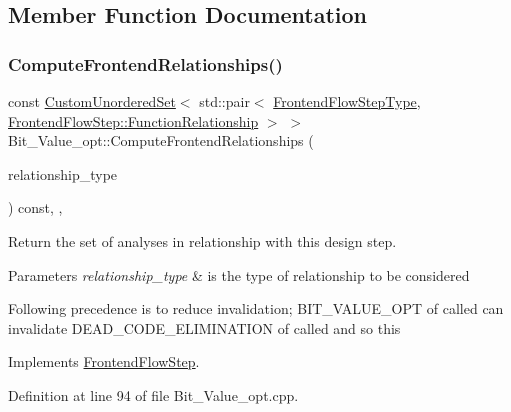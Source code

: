 \subsection{Member Function Documentation}
\mbox{\label{classBit__Value__opt_a8c842c1ab18449cecf5586caef4c7112}} 
\subsubsection{\texorpdfstring{Compute\+Frontend\+Relationships()}{ComputeFrontendRelationships()}}
{\footnotesize\ttfamily const \hyperlink{classCustomUnorderedSet}{Custom\+Unordered\+Set}$<$ std\+::pair$<$ \hyperlink{frontend__flow__step_8hpp_afeb3716c693d2b2e4ed3e6d04c3b63bb}{Frontend\+Flow\+Step\+Type}, \hyperlink{classFrontendFlowStep_af7cf30f2023e5b99e637dc2058289ab0}{Frontend\+Flow\+Step\+::\+Function\+Relationship} $>$ $>$ Bit\+\_\+\+Value\+\_\+opt\+::\+Compute\+Frontend\+Relationships (\begin{DoxyParamCaption}\item[{const \hyperlink{classDesignFlowStep_a723a3baf19ff2ceb77bc13e099d0b1b7}{Design\+Flow\+Step\+::\+Relationship\+Type}}]{relationship\+\_\+type }\end{DoxyParamCaption}) const\hspace{0.3cm}{\ttfamily [override]}, {\ttfamily [private]}, {\ttfamily [virtual]}}



Return the set of analyses in relationship with this design step. 


\begin{DoxyParams}{Parameters}
{\em relationship\+\_\+type} & is the type of relationship to be considered \\
\hline
\end{DoxyParams}
Following precedence is to reduce invalidation; B\+I\+T\+\_\+\+V\+A\+L\+U\+E\+\_\+\+O\+PT of called can invalidate D\+E\+A\+D\+\_\+\+C\+O\+D\+E\+\_\+\+E\+L\+I\+M\+I\+N\+A\+T\+I\+ON of called and so this 

Implements \hyperlink{classFrontendFlowStep_abeaff70b59734e462d347ed343dd700d}{Frontend\+Flow\+Step}.



Definition at line 94 of file Bit\+\_\+\+Value\+\_\+opt.\+cpp.



